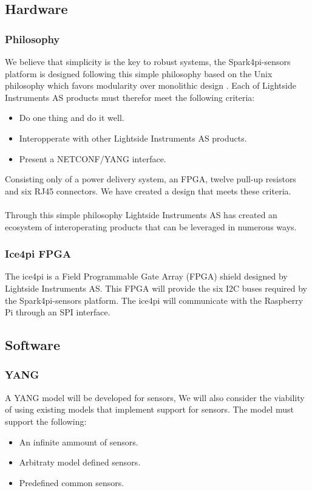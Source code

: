 \documentclass[12pt]{article}
\begin{document}
\subsection{Hardware}
\subsubsection{Philosophy}
We believe that simplicity is the key to robust systems, 
the Spark4pi-sensors platform is designed following this simple philosophy based on the 
Unix philosophy which favors modularity over monolithic design \cite{BasicsUnixPhilosophy}.
Each of Lightside Instruments AS products must therefor meet the following criteria:
\begin{itemize}
    \item Do one thing and do it well.
    \item Interopperate with other Lightside Instruments AS products.
    \item Present a NETCONF/YANG interface.
\end{itemize}
Consisting only of a power delivery system, an FPGA, twelve pull-up resistors and six RJ45 connectors. 
We have created a design that meets these criteria.
\\
\\
Through this simple philosophy Lightside Instruments AS has created an ecosystem of interoperating products that can be
leveraged in numerous ways.

\subsubsection{Ice4pi FPGA}
The ice4pi is a Field Programmable Gate Array (FPGA) shield designed by Lightside Instruments AS.
This FPGA will provide the six I2C buses required by the Spark4pi-sensors platform. 
The ice4pi will communicate with the Raspberry Pi through an SPI interface.

\subsection{Software}
\subsubsection{YANG}
A YANG model will be developed for sensors, 
We will also consider the viability of using existing models that implement support for sensors.
The model must support the following:
\begin{itemize}
  \item An infinite ammount of sensors.
  \item Arbitraty model defined sensors.
  \item Predefined common sensors.
\end{itemize}
\end{document}

